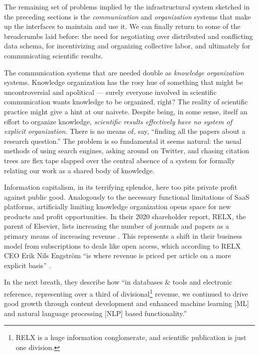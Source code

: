 \documentclass[10pt]{article}
\begin{document}
\begin{multicols}{2}
 The remaining set of problems implied by the
infrastructural system sketched in the preceding sections is the
\emph{communication} and \emph{organization} systems that make up the
interfaces to maintain and use it. We can finally return to some of the
breadcrumbs laid before: the need for negotiating over distributed and
conflicting data schema, for incentivizing and organizing collective
labor, and ultimately for communicating scientific results.

The communication systems that are needed double as \emph{knowledge
organization} systems. Knowledge organization has the rosy hue of
something that might be uncontroversial and apolitical --- surely
everyone involved in scientific communication wants knowledge to be
organized, right? The reality of scientific practice might give a hint
at our naivete. Despite being, in some sense, itself an effort to
organize knowledge, \emph{scientific results effectively have no system
of explicit organization.} There is no means of, say, ``finding all the
papers about a research question.'' The problem is so fundamental it
seems natural: the usual methods of using search engines, asking around
on Twitter, and chasing citation trees are flex tape slapped over the
central absence of a system for formally relating our work as a shared
body of knowledge.

Information capitalism, in its terrifying splendor, here too pits
private profit against public good. Analogously to the necessary
functional limitations of SaaS platforms, artificially limiting
knowledge organization opens space for new products and profit
opportunities. In their 2020 shareholder report, RELX, the parent of
Elsevier, lists increasing the number of journals and papers as a
primary means of increasing revenue \cite{RELXAnnualReport2020} .
This represents a shift in their business model from subscriptions to
deals like open access, which according to RELX CEO Erik Nils Engström
``is where revenue is priced per article on a more explicit basis'' \cite{relx2020ResultsPresentation2021} .

In the next breath, they describe how ``in databases \& tools and
electronic reference, representing over a third of divisional\footnote{RELX
  is a huge information conglomerate, and scientific publication is just
  one division.} revenue, we continued to drive good growth through
content development and enhanced machine learning {[}ML{]} and natural
language processing {[}NLP{]} based functionality.''


\end{multicols}
\end{document}

